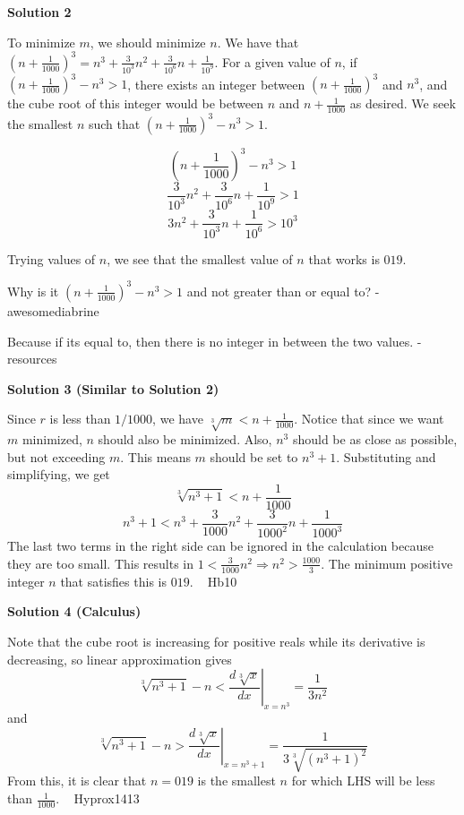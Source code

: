\begin{enumerate}
 



\textbf{Solution 2}

To minimize $m$, we should minimize $n$. We have that $(n + \frac{1}{1000})^3 = n^3 + \frac{3}{10^3} n^2 + \frac{3}{10^6} n + \frac{1}{10^9}$. For a given value of $n$, if $(n + \frac{1}{1000})^3 - n^3 > 1$, there exists an integer between $(n + \frac{1}{1000})^3$ and $n^3$, and the cube root of this integer would be between $n$ and $n + \frac{1}{1000}$ as desired. We seek the smallest $n$ such that $(n + \frac{1}{1000})^3 - n^3 > 1$. 

 
 \[(n + \frac{1}{1000})^3 - n^3 > 1\]
 \[\frac{3}{10^3} n^2 + \frac{3}{10^6} n + \frac{1}{10^9} > 1\]
 \[3n^2 + \frac{3}{10^3} n + \frac{1}{10^6} > 10^3\]

 Trying values of $n$, we see that the smallest value of $n$ that works is $\boxed{019}$.

 Why is it $(n + \frac{1}{1000})^3 - n^3 > 1$ and not greater than or equal to? - awesomediabrine

 Because if its equal to, then there is no integer in between the two values. - resources

 



\textbf{Solution 3 (Similar to Solution 2)}

Since $r$ is less than $1/1000$, we have $\sqrt[3]{m} < n + \frac{1}{1000}$. Notice that since we want $m$ minimized, $n$ should also be minimized. Also, $n^3$ should be as close as possible, but not exceeding $m$. This means $m$ should be set to $n^3+1$. Substituting and simplifying, we get 
 \[\sqrt[3]{n^3+1} < n + \frac{1}{1000}\] 
 \[n^3+1 < n^3+\frac{3}{1000}n^2+\frac{3}{1000^2}n+\frac{1}{1000^3}\]The last two terms in the right side can be ignored in the calculation because they are too small. This results in $1 < \frac{3}{1000}n^2 \Rightarrow n^2 > \frac{1000}{3}$. The minimum positive integer $n$ that satisfies this is $\boxed{019}$. ~ Hb10

 



\textbf{Solution 4 (Calculus)}

Note that the cube root is increasing for positive reals while its derivative is decreasing, so linear approximation gives
 \[\sqrt[3]{n^3+1} - n < \left.\frac{d\sqrt[3]{x}}{dx}\right|_{x=n^3} = \frac{1}{3n^2}\]and
 \[\sqrt[3]{n^3+1} - n > \left.\frac{d\sqrt[3]{x}}{dx}\right|_{x=n^3+1} = \frac{1}{3\sqrt[3]{(n^3+1)^2}}\]From this, it is clear that $n = \boxed{019}$ is the smallest $n$ for which LHS will be less than $\frac{1}{1000}$. ~ Hyprox1413


\end{enumerate}
